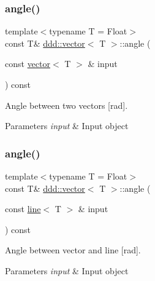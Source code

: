 \subsubsection{\texorpdfstring{angle()}{angle()}\hspace{0.1cm}{\footnotesize\ttfamily [1/5]}}
{\footnotesize\ttfamily template$<$typename T = Float$>$ \\
const T\& \hyperlink{classddd_1_1vector}{ddd\+::vector}$<$ T $>$\+::angle (\begin{DoxyParamCaption}\item[{const \hyperlink{classddd_1_1vector}{vector}$<$ T $>$ \&}]{input }\end{DoxyParamCaption}) const\hspace{0.3cm}{\ttfamily [inline]}}



Angle between two vectors \mbox{[}rad\mbox{]}. 


\begin{DoxyParams}{Parameters}
{\em input} & Input object \\
\hline
\end{DoxyParams}
\mbox{\label{classddd_1_1vector_a97a1359914c22ea1e3928f02fc650bac}} 
\subsubsection{\texorpdfstring{angle()}{angle()}\hspace{0.1cm}{\footnotesize\ttfamily [2/5]}}
{\footnotesize\ttfamily template$<$typename T = Float$>$ \\
const T\& \hyperlink{classddd_1_1vector}{ddd\+::vector}$<$ T $>$\+::angle (\begin{DoxyParamCaption}\item[{const \hyperlink{classddd_1_1line}{line}$<$ T $>$ \&}]{input }\end{DoxyParamCaption}) const\hspace{0.3cm}{\ttfamily [inline]}}



Angle between vector and line \mbox{[}rad\mbox{]}. 


\begin{DoxyParams}{Parameters}
{\em input} & Input object \\
\hline
\end{DoxyParams}
\mbox{\label{classddd_1_1vector_a893bfd1b0209a0a7e7630a3ddf38193d}} 
